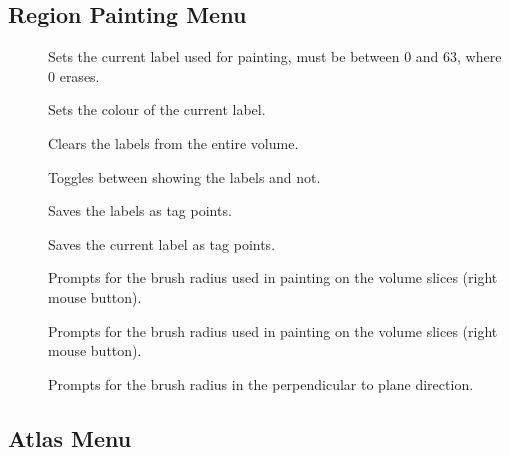 \subsection{Region Painting Menu}

\begin{description}
\item[]  Sets the current label
    used for painting, must be between 0 and 63, where 0 erases.
\item[]  Sets the colour
    of the current label.
\item[]  Clears the labels from
    the entire volume.
\item[]  Toggles between showing the
    labels and not.
\item[]  Saves the labels as tag
    points.
\item[]  Saves the current label
    as tag points.
\item[]  Prompts for the brush radius used
    in painting on the volume slices (right mouse button).
\item[]  Prompts for the brush radius used
    in painting on the volume slices (right mouse button).
\item[]  Prompts for the brush
    radius in the perpendicular to plane direction.
\end{description}

\subsection{Atlas Menu}

